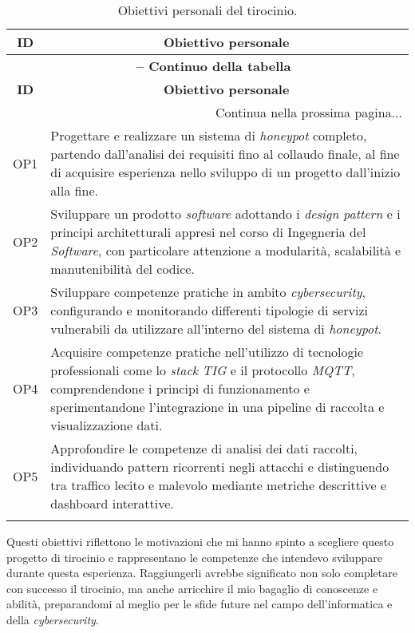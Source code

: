 \begin{center}
\begin{longtable}{|p{}|p{}|}
\hline
\multicolumn{1}{|c|}{\textbf{ID}} & \multicolumn{1}{c|}{\textbf{Obiettivo personale}}\\ 
\hline 
\endfirsthead
\multicolumn{2}{c}{{\bfseries \tablename\ \thetable{} -- Continuo della tabella}}\\
\hline
\multicolumn{1}{|c|}{\textbf{ID}} & \multicolumn{1}{c|}{\textbf{Obiettivo personale}}\\ \hline 
\endhead
\hline
\multicolumn{2}{|r|}{{Continua nella prossima pagina...}}\\
\hline
\endfoot
\endlastfoot 

OP1 & Progettare e realizzare un sistema di \textit{honeypot} completo, partendo dall'analisi dei requisiti fino al collaudo finale, al fine di acquisire esperienza nello sviluppo di un progetto dall'inizio alla fine. \\ \hline
OP2 & Sviluppare un prodotto \textit{software} adottando i \textit{design pattern} e i principi architetturali appresi nel corso di Ingegneria del \textit{Software}, con particolare attenzione a modularità, scalabilità e manutenibilità del codice. \\ \hline
OP3 & Sviluppare competenze pratiche in ambito \textit{cybersecurity}, configurando e monitorando differenti tipologie di servizi vulnerabili da utilizzare all'interno del sistema di \textit{honeypot}. \\ \hline
OP4 & Acquisire competenze pratiche nell'utilizzo di tecnologie professionali come lo \textit{stack} \textit{TIG} e il protocollo \textit{MQTT}, comprendendone i principi di funzionamento e sperimentandone l'integrazione in una pipeline di raccolta e visualizzazione dati. \\ \hline
OP5 & Approfondire le competenze di analisi dei dati raccolti, individuando pattern ricorrenti negli attacchi e distinguendo tra traffico lecito e malevolo mediante metriche descrittive e dashboard interattive. \\ \hline

\caption{Obiettivi personali del tirocinio.}
\label{tab:obiettivi-personali}
\end{longtable}
\end{center}
Questi obiettivi riflettono le motivazioni che mi hanno spinto a scegliere questo progetto di tirocinio e rappresentano le competenze che intendevo sviluppare durante questa esperienza. Raggiungerli avrebbe significato non solo completare con successo il tirocinio, ma anche arricchire il mio bagaglio di conoscenze e abilità, preparandomi al meglio per le sfide future nel campo dell'informatica e della \textit{cybersecurity}.